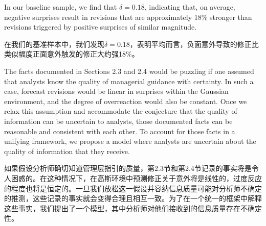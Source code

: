 \documentclass[12pt,a4paper]{article}
\newenvironment{original}
  {\par\medskip\noindent\ignorespaces}
  {\par\medskip}
\newenvironment{translation}
  {\par\noindent{\color{transblue}\ignorespaces}}
  {\par\bigskip}
\begin{document}
\begin{original}
In our baseline sample, we find that $\delta = 0.18$, indicating that, on average, negative surprises result in revisions that are approximately 18\% stronger than revisions triggered by positive surprises of similar magnitude.
\end{original}
\begin{translation}
在我们的基准样本中，我们发现$\delta = 0.18$，表明平均而言，负面意外导致的修正比类似幅度正面意外触发的修正大约强18\%。
\end{translation}

\begin{original}
The facts documented in Sections 2.3 and 2.4 would be puzzling if one assumed that analysts know the quality of managerial guidance with certainty. In such a case, forecast revisions would be linear in surprises within the Gaussian environment, and the degree of overreaction would also be constant. Once we relax this assumption and accommodate the conjecture that the quality of information can be uncertain to analysts, those documented facts can be reasonable and consistent with each other. To account for those facts in a unifying framework, we propose a model where analysts are uncertain about the quality of information that they receive.
\end{original}
\begin{translation}
如果假设分析师确切知道管理层指引的质量，第2.3节和第2.4节记录的事实将是令人困惑的。在这种情况下，在高斯环境中预测修正关于意外将是线性的，过度反应的程度也将是恒定的。一旦我们放松这一假设并容纳信息质量可能对分析师不确定的推测，这些记录的事实就会变得合理且相互一致。为了在一个统一的框架中解释这些事实，我们提出了一个模型，其中分析师对他们接收到的信息质量存在不确定性。
\end{translation}

\end{document}
